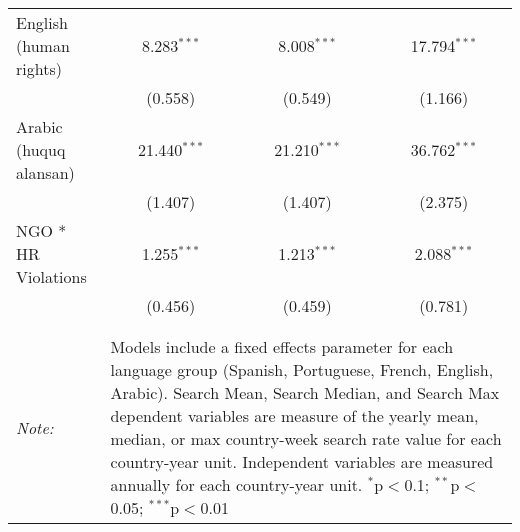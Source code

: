 \begin{table}[!htbp]
\begin{tabular}{@{\extracolsep{5pt}}lccc}
  English (human rights) & 8.283$^{***}$ & 8.008$^{***}$ & 17.794$^{***}$ \\ 
  & (0.558) & (0.549) & (1.166) \\ 
  Arabic (huquq alansan) & 21.440$^{***}$ & 21.210$^{***}$ & 36.762$^{***}$ \\ 
  & (1.407) & (1.407) & (2.375) \\ 
  NGO * HR Violations & 1.255$^{***}$ & 1.213$^{***}$ & 2.088$^{***}$ \\ 
  & (0.456) & (0.459) & (0.781) \\ 
 \hline \\[-1.8ex] 
\hline 
\hline \\[-1.8ex] 
\textit{Note:}  & \multicolumn{3}{l}{\parbox[t]{8cm}{Models include a fixed effects parameter for each language group (Spanish, Portuguese, French, English, Arabic). Search Mean, Search Median, and Search Max dependent variables are measure of the yearly mean, median, or max country-week search rate value for each country-year unit. Independent variables are measured annually for each country-year unit. $^{*}$p$<$0.1; $^{**}$p$<$0.05; $^{***}$p$<$0.01}} \\ 
\end{tabular} 
\end{table} 
